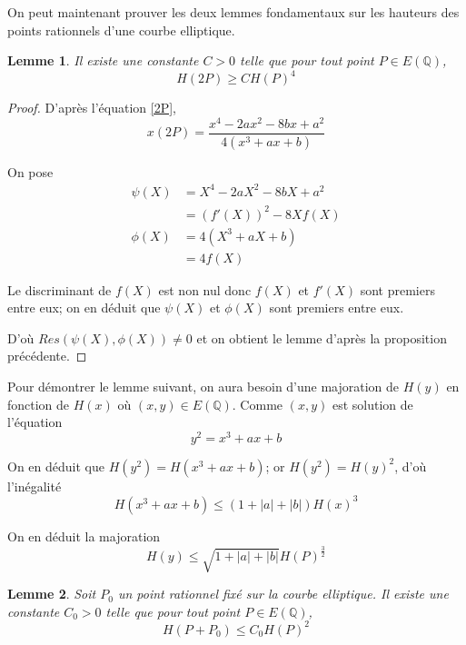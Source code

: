 \documentclass{article}
\newtheorem{lemme}{Lemme}
\begin{document}
On peut maintenant prouver les deux lemmes fondamentaux sur les hauteurs des points rationnels d'une courbe elliptique.

\begin{lemme}
\label{lem2P}
Il existe une constante $C > 0$ telle que pour tout point $P \in E(\mathbb{Q})$,
\begin{equation*}
H(2P) \geq CH(P)^4
\end{equation*}
\end{lemme}

\begin{proof}
D'après l'équation \ref{2P}, 
\begin{equation*}
x(2P) = \frac{x^4 - 2ax^2 - 8bx + a^2}{4(x^3 + ax + b)}
\end{equation*}

On pose
\begin{align*}
\psi(X) &= X^4 - 2aX^2 - 8bX + a^2 \\
		&= (f'(X))^2 - 8Xf(X)\\
\phi(X) &= 4(X^3 + aX + b) \\
		&= 4f(X)
\end{align*}

Le discriminant de $f(X)$ est non nul donc $f(X)$ et $f'(X)$ sont premiers entre eux; on en déduit que $\psi(X)$ et $\phi(X)$ sont premiers entre eux.

D'où $Res(\psi(X), \phi(X)) \neq 0$ et on obtient le lemme d'après la proposition précédente.
\end{proof}

Pour démontrer le lemme suivant, on aura besoin d'une majoration de $H(y)$ en fonction de $H(x)$ où 
$(x,y) \in E(\mathbb{Q})$. Comme $(x, y)$ est solution de l'équation
\begin{equation*}
y^2 = x^3 + ax + b
\end{equation*}

On en déduit que $H(y^2)=H(x^3+ax+b)$; or $H(y^2)=H(y)^2$, d'où l'inégalité
\begin{equation*}
H(x^3+ax+b)\leq (1+|a|+|b|)H(x)^3
\end{equation*}

On en déduit la majoration
\begin{equation*}
H(y) \leq \sqrt{1 + |a| + |b|}H(P)^{\frac{3}{2}}
\end{equation*}

\begin{lemme}
\label{lemP+P0}
Soit $P_{0}$ un point rationnel fixé sur la courbe elliptique. Il existe une constante $C_{0} > 0$ telle que
pour tout point $P\in E(\mathbb{Q})$,
\begin{equation*}
H(P+P_{0}) \leq C_{0}H(P)^2
\end{equation*}
\end{lemme}
\end{document}
